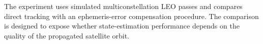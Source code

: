 The experiment uses simulated multiconstellation LEO passes and compares direct tracking with an ephemeris-error compensation procedure. The comparison is designed to expose whether state-estimation performance depends on the quality of the propagated satellite orbit.
